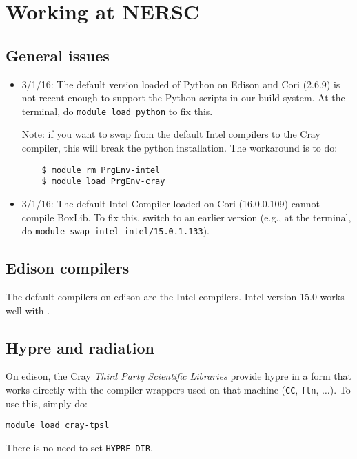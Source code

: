 \section{Working at NERSC}

\subsection{General issues}

\begin{itemize}

\item 3/1/16: The default version loaded of Python on Edison and Cori
  (2.6.9) is not recent enough to support the Python scripts in our
  build system. At the terminal, do {\tt module load python} to fix
  this.

  Note: if you want to swap from the default Intel compilers to the 
  Cray compiler, this will break the python installation.  The workaround
  is to do:
  \begin{verbatim}
    $ module rm PrgEnv-intel
    $ module load PrgEnv-cray
  \end{verbatim}

\item 3/1/16: The default Intel Compiler loaded on Cori (16.0.0.109)
  cannot compile BoxLib. To fix this, switch to an earlier version
  (e.g., at the terminal, do {\tt module swap intel
    intel/15.0.1.133}).


\end{itemize}

\subsection{Edison compilers}

The default compilers on edison are the Intel compilers.  Intel version 15.0
works well with \castro.


\subsection{Hypre and radiation}

On edison, the Cray {\em Third Party Scientific Libraries} provide
{\sf hypre} in a form that works directly with the compiler wrappers
used on that machine ({\tt CC}, {\tt ftn}, $\ldots$).  To use this,
simply do:
\begin{verbatim}
module load cray-tpsl
\end{verbatim}
There is no need to set {\tt HYPRE\_DIR}.  

